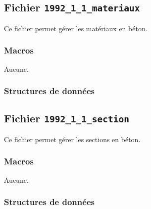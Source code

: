 \documentclass{article}
\begin{document}
\subsection{Fichier {\texttt{1992\_1\_1\_materiaux}}}
Ce fichier permet gérer les matériaux en béton.
\subsubsection{Macros}
Aucune.
\subsubsection{Structures de données}









\subsection{Fichier {\texttt{1992\_1\_1\_section}}}
Ce fichier permet gérer les sections en béton.
\subsubsection{Macros}
Aucune.
\subsubsection{Structures de données}




















\end{document}
